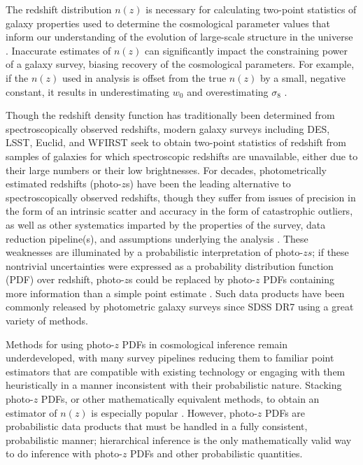 \documentclass[preprint]{aastex}
\begin{document}
The redshift distribution $n(z)$ is necessary for calculating two-point statistics of galaxy properties used to determine the cosmological parameter values that inform our understanding of the evolution of large-scale structure in the universe \citep{masters_mapping_2015}.  Inaccurate estimates of $n(z)$ can significantly impact the constraining power of a galaxy survey, biasing recovery of the cosmological parameters.  For example, if the $n(z)$ used in analysis is offset from the true $n(z)$ by a small, negative constant, it results in underestimating $w_{0}$ and overestimating $\sigma_{8}$ \citep{samuroff_simultaneous_2017}.

Though the redshift density function has traditionally been determined from spectroscopically observed redshifts, modern galaxy surveys including DES, LSST, Euclid, and WFIRST seek to obtain two-point statistics of redshift from samples of galaxies for which spectroscopic redshifts are unavailable, either due to their large numbers or their low brightnesses.  For decades, photometrically estimated redshifts (photo-$z$s) have been the leading alternative to spectroscopically observed redshifts, though they suffer from issues of precision in the form of an intrinsic scatter and accuracy in the form of catastrophic outliers, as well as other systematics imparted by the properties of the survey, data reduction pipeline(s), and assumptions underlying the analysis \citep{baum_photoelectric_1962}.  These weaknesses are illuminated by a probabilistic interpretation of photo-$zs$; if these nontrivial uncertainties were expressed as a probability distribution function (PDF) over redshift, photo-$z$s could be replaced by photo-$z$ PDFs containing more information than a simple point estimate \citep{koo_overview_1999}.  Such data products have been commonly released by photometric galaxy surveys since SDSS DR7 \citep{abazajian_seventh_2009} using a great variety of methods.

Methods for using photo-$z$ PDFs in cosmological inference remain underdeveloped, with many survey pipelines reducing them to familiar point estimators that are compatible with existing technology or engaging with them heuristically in a manner inconsistent with their probabilistic nature.  Stacking photo-$z$ PDFs, or other mathematically equivalent methods, to obtain an estimator of $n(z)$ is especially popular \citep{cunha_estimating_2009, sheldon_photometric_2012}.  However, photo-$z$ PDFs are probabilistic data products that must be handled in a fully consistent, probabilistic manner; hierarchical inference is the only mathematically valid way to do inference with photo-$z$ PDFs and other probabilistic quantities.
\end{document}
